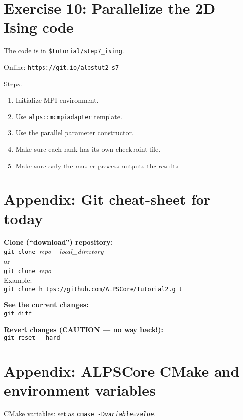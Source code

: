 \documentclass[12pt]{article}
\newcommand{\code}[1]{\texttt{#1}}
\begin{document}
\pagebreak
\section*{Exercise 10: Parallelize the 2D Ising code}

The code is in \texttt{\color{ballblue}\$tutorial/step7\_ising}.

Online: \nolinkurl{https://git.io/alpstut2_s7}

Steps: 
\begin{enumerate}
\item Initialize MPI environment.
\item Use \code{alps::mcmpiadapter} template.
\item Use the parallel parameter constructor.
\item Make sure each rank has its own checkpoint file.
\item Make sure only the master process outputs the results.
\end{enumerate}


\section*{Appendix: Git cheat-sheet for today}
\begin{flushleft}
\textbf{Clone (``download'') repository:}\\
\lstinline[style=showspaces]|git clone |\emph{repo}%
\lstinline[style=showspaces]| |%
\emph{local\_directory}\\
or \\
\lstinline[style=showspaces]|git clone |\emph{repo}\\
Example: \\
\lstinline[style=showspaces]|git clone https://github.com/ALPSCore/Tutorial2.git|

\textbf{See the current changes:}\\
\lstinline[style=showspaces]{git diff}

\textbf{Revert changes (CAUTION --- no way back!):}\\
\lstinline[style=showspaces]|git reset --hard|
\end{flushleft}

\pagebreak

\section*{Appendix: ALPSCore CMake and environment variables}
\label{ref:cmakevars}%
CMake variables: set as \code{cmake
  -D\textit{variable}=\textit{value}}.
\end{document}
